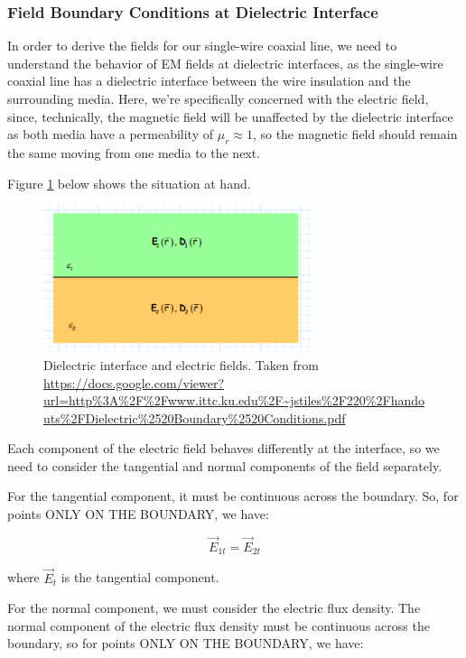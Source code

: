 \documentclass[12pt,onecolumn,titlepage]{article}
\begin{document}
\subsubsection{Field Boundary Conditions at Dielectric Interface}
\indent \indent In order to derive the fields for our single-wire coaxial line, we need to understand the behavior of EM fields at dielectric interfaces, as the single-wire coaxial line has a dielectric interface between the wire insulation and the surrounding media. Here, we're specifically concerned with the electric field, since, technically, the magnetic field will be unaffected by the dielectric interface as both media have a permeability of $\mu_r \approx 1$, so the magnetic field should remain the same moving from one media to the next.

Figure \ref{fig:dielectric_interface} below shows the situation at hand.

\begin{figure}[htbp]
	\centering
	\includegraphics[width=0.7\textwidth]{Pictures/4June2013/dielectric_interface}
	\caption{ Dielectric interface and electric fields. Taken from \url{https://docs.google.com/viewer?url=http\%3A\%2F\%2Fwww.ittc.ku.edu\%2F~jstiles\%2F220\%2Fhandouts\%2FDielectric\%2520Boundary\%2520Conditions.pdf}} 
	\label{fig:dielectric_interface}
\end{figure}

Each component of the electric field behaves differently at the interface, so we need to consider the tangential and normal components of the field separately. 

For the tangential component, it must be continuous across the boundary. So, for points ONLY ON THE BOUNDARY, we have:

\[ \vec{E}_{1t} = \vec{E}_{2t} \]

where $\vec{E}_t$ is the tangential component.

For the normal component, we must consider the electric flux density. The normal component of the electric flux density must be continuous across the boundary, so for points ONLY ON THE BOUNDARY, we have:
\end{document}
